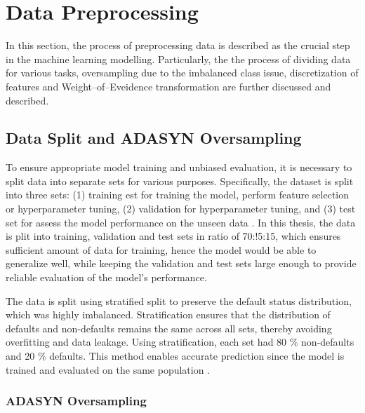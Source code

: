 \newpage
\section{Data Preprocessing}
In this section, the process of preprocessing data is described as the crucial step in the machine learning modelling. Particularly, the the process of dividing data for various tasks, oversampling due to the imbalanced class issue, discretization of features and Weight--of--Eveidence transformation are further discussed and described.

\subsection{Data Split and ADASYN Oversampling}
\label{subsec:data-split-ADASYN}

To ensure appropriate model training and unbiased evaluation, it is necessary to split data into separate sets for various purposes. Specifically, the dataset is split into three sets: (1) training est for training the model, perform feature selection or hyperparameter tuning, (2) validation for hyperparameter tuning, and (3) test set for assess the model performance on the unseen data \citep{subasi2020practical}.
In this thesis, the data is plit into training, validation and test sets in ratio of 70:!5:15, which ensures sufficient amount of data for training, hence the model would be able to generalize well, while keeping the validation and test sets large enough to provide reliable evaluation of the model's performance.

The data is split using stratified split to preserve the default status distribution, which was highly imbalanced.
Stratification ensures that the distribution of defaults and non-defaults remains the same across all sets, thereby avoiding overfitting and data leakage. Using stratification, each set had 80 \% non-defaults and 20 \% defaults. This method enables accurate prediction since the model is trained and evaluated on the same population \citep{igareta2021strat}.

\subsubsection{ADASYN Oversampling}


